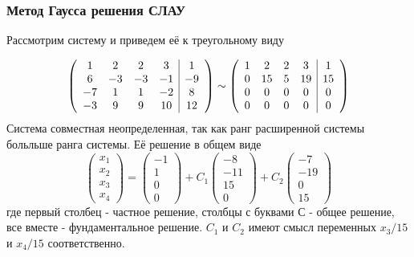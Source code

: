 \subsubsection{Метод Гаусса решения СЛАУ}
\begin{example}
Рассмотрим систему и приведем её к треугольному виду
\end{example}
$$\left( \begin{array}{cccccc}
    1&2&2&3&\multicolumn{1}{|c}{1} \\
    6&-3&-3&-1&\multicolumn{1}{|c}{-9}  \\
    -7&1&1&-2&\multicolumn{1}{|c}{8}\\
    -3&9&9&10&\multicolumn{1}{|c}{12}
\end{array} \right) \sim
\left( \begin{array}{cccccc}
    1&2&2&3&\multicolumn{1}{|c}{1} \\
    0&15&5&19&\multicolumn{1}{|c}{15}  \\
    0&0&0&0&\multicolumn{1}{|c}{0}\\
    0&0&0&0&\multicolumn{1}{|c}{0}
\end{array} \right)
$$
Система совместная неопределенная, так как ранг расширенной системы больльше 
ранга системы. Её решение в общем виде 
$$\left( \begin{array}{c}x_1\\x_2\\x_3\\x_4 \end{array}\right) =
\left( \begin{array}{c}-1\\1\\0\\0\end{array}\right)+
C_1 \left( \begin{array}{c}-8\\-11\\15\\0 \end{array}\right)+
C_2\left( \begin{array}{c}-7\\-19\\0\\15 \end{array}\right)
$$
где первый столбец - частное решение, столбцы с буквами С - общее решение, 
все вместе - фундаментальное решение. $C_1$ и $C_2$ имеют смысл переменных
$x_3/15$ и $x_4/15$ соответственно.
